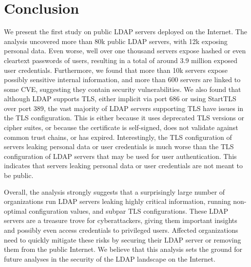 \section{Conclusion}
\label{sec:conclusion}
We present the first study on public LDAP servers deployed on the Internet. The analysis uncovered more than 80k public LDAP servers, with 12k exposing personal data. Even worse, well over one thousand servers expose hashed or even cleartext passwords of users, resulting in a total of around 3.9 million exposed user credentials. 
Furthermore, we found that more than 10k servers expose possibly sensitive internal information, and more than 600 servers are linked to some CVE, suggesting they contain security vulnerabilities. We also found that although LDAP supports TLS, either implicit via port 686 or using StartTLS over port 389, the vast majority of LDAP servers supporting TLS have issues in the TLS configuration. This is either because it uses deprecated TLS versions or cipher suites, or because the certificate is self-signed, does not validate against common trust chains, or has expired. Interestingly, the TLS configuration of servers leaking personal data or user credentials is much worse than the TLS configuration of LDAP servers that may be used for user authentication. This indicates that servers leaking personal data or user credentials are not meant to be public.

Overall, the analysis strongly suggests that a surprisingly large number of organizations run LDAP servers leaking highly critical information, running non-optimal configuration values, and subpar TLS configurations. These LDAP servers are a treasure trove for cyberattackers, giving them important insights and possibly even access credentials to privileged users. Affected organizations need to quickly mitigate these risks by securing their LDAP server or removing them from the public Internet. We believe that this analysis sets the ground for future analyses in the security of the LDAP landscape on the Internet.


